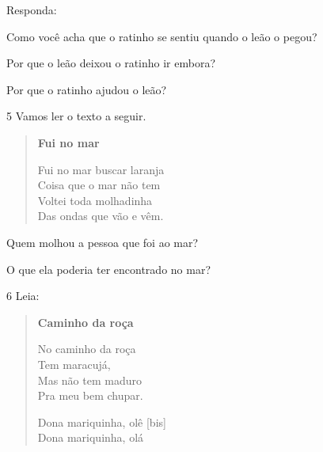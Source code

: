 
Responda:

\begin{escolha}
\item Como você acha que o ratinho se sentiu quando o leão o pegou?


\item Por que o leão deixou o ratinho ir embora?


\item Por que o ratinho ajudou o leão?

\end{escolha}

\num{5} Vamos ler o texto a seguir.

\begin{verse}
\textbf{Fui no mar}

Fui no mar buscar laranja\\
Coisa que o mar não tem\\
Voltei toda molhadinha\\
Das ondas que vão e vêm.
\end{verse}


\begin{escolha}
\item Quem molhou a pessoa que foi ao mar?


\item O que ela poderia ter encontrado no mar?

\end{escolha}

\num{6} Leia:


\begin{verse}
\textbf{Caminho da roça}

No caminho da roça\\
Tem maracujá,\\
Mas não tem maduro\\
Pra meu bem chupar.

Dona mariquinha, olê {[}bis{]}\\
Dona mariquinha, olá
\end{verse}

